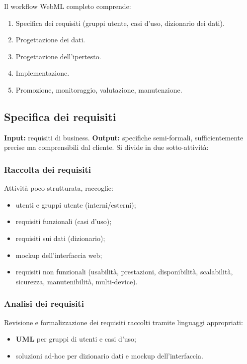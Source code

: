 \documentclass[11pt,a4paper]{article}
\begin{document}
Il workflow WebML completo comprende:
\begin{enumerate}[leftmargin=*]
    \item Specifica dei requisiti (gruppi utente, casi d'uso, dizionario dei dati).
    \item Progettazione dei dati.
    \item Progettazione dell'ipertesto.
    \item Implementazione.
    \item Promozione, monitoraggio, valutazione, manutenzione.
\end{enumerate}

\subsection{Specifica dei requisiti}

\textbf{Input:} requisiti di business. \textbf{Output:} specifiche semi-formali, sufficientemente precise ma comprensibili dal cliente. Si divide in due sotto-attivit\`a:

\subsubsection{Raccolta dei requisiti}
Attivit\`a poco strutturata, raccoglie:
\begin{itemize}[leftmargin=*]
    \item utenti e gruppi utente (interni/esterni);
    \item requisiti funzionali (casi d'uso);
    \item requisiti sui dati (dizionario);
    \item mockup dell'interfaccia web;
    \item requisiti non funzionali (usabilit\`a, prestazioni, disponibilit\`a, scalabilit\`a, sicurezza, manutenibilit\`a, multi-device).
\end{itemize}

\subsubsection{Analisi dei requisiti}
Revisione e formalizzazione dei requisiti raccolti tramite linguaggi appropriati:
\begin{itemize}[leftmargin=*]
    \item \textbf{UML} per gruppi di utenti e casi d'uso;
    \item soluzioni ad-hoc per dizionario dati e mockup dell'interfaccia.
\end{itemize}
\end{document}
